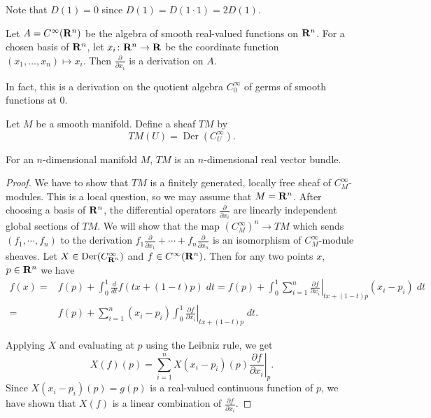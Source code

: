 \documentclass[a4paper,openany]{scrbook}
\DeclareMathOperator{\Der}{Der}
\begin{document}
Note that $D(1)=0$ since $D(1) = D(1\cdot 1)=2D(1)$.

\begin{example}
Let $A=C^\infty(\mathbf R^n)$ be the algebra of smooth real-valued functions on $\mathbf R^n$. For a chosen basis of $\mathbf R^n$, let $x_i\colon \mathbf R^n \to \mathbf R$ be the coordinate function $(x_1,\dots,x_n) \mapsto x_i$. Then $\frac\partial{\partial x_i}$ is a derivation on $A$.

In fact, this is a derivation on the quotient algebra $C^\infty_0$ of germs of smooth functions at $0$.
\end{example}

\begin{defn}
Let $M$ be a smooth manifold. Define a sheaf $TM$ by
\[
TM(U) = \Der(C^{\infty}_U).
\]
\end{defn}

\begin{thm} \label{thm:tangentspacebundle}
For an $n$-dimensional manifold $M$, $TM$ is an $n$-dimensional real vector bundle.
\end{thm}
\begin{proof}
We have to show that $TM$ is a finitely generated, locally free sheaf of $C^\infty_M$-modules. This is a local question, so we may assume that $M = \mathbf R^n$. After choosing a basis of $\mathbf R^n$, the differential operators $\frac\partial{\partial x_i}$ are linearly independent global sections of $TM$. We will show that the map $(C^\infty_M)^n \to TM$ which sends $(f_1,\cdots,f_n)$ to the derivation $f_1\frac\partial{\partial x_1}+\cdots+f_n\frac\partial{\partial x_n}$ is an isomorphism of $C^\infty_M$-module sheaves. Let $X \in \Der(C^\infty_{\R^n})$ and $f \in C^\infty(\mathbf R^n)$. Then for any two points $x$, $p \in \mathbf R^n$ we have
\begin{align*}
f(x) = & f(p)+\int_0^1 \frac d {dt} f(tx+(1-t)p)\; dt = f(p) + \int_0^1 \sum_{i=1}^n\left.\frac{\partial f}{\partial x_i}\right|_{tx+(1-t)p} (x_i-p_i)\; dt \\
= & f(p) + \sum_{i=1}^n (x_i-p_i) \int_0^1 \left.\frac{\partial f}{\partial x_i}\right|_{tx+(1-t)p}\; dt.
\end{align*}

Applying $X$ and evaluating at $p$ using the Leibniz rule, we get
\[
X(f)(p) = \sum_{i=1}^n X(x_i-p_i)(p) \left.\frac{\partial f}{\partial x_i}\right|_p.
\]
Since $X(x_i-p_i)(p) = g(p)$ is a real-valued continuous function of $p$, we have shown that $X(f)$ is a linear combination of $\frac{\partial f}{\partial x_i}$.
\end{proof}
\end{document}
